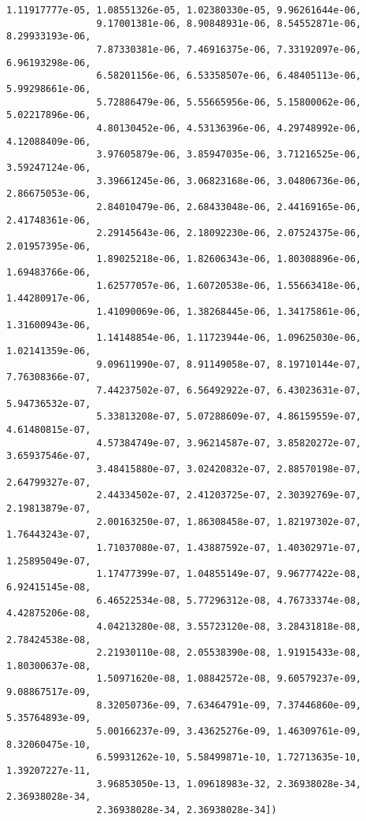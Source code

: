 \documentclass[11pt]{article}
\begin{document}
\begin{Verbatim}[commandchars=\\\{\}]
                1.11917777e-05, 1.08551326e-05, 1.02380330e-05, 9.96261644e-06,
                9.17001381e-06, 8.90848931e-06, 8.54552871e-06, 8.29933193e-06,
                7.87330381e-06, 7.46916375e-06, 7.33192097e-06, 6.96193298e-06,
                6.58201156e-06, 6.53358507e-06, 6.48405113e-06, 5.99298661e-06,
                5.72886479e-06, 5.55665956e-06, 5.15800062e-06, 5.02217896e-06,
                4.80130452e-06, 4.53136396e-06, 4.29748992e-06, 4.12088409e-06,
                3.97605879e-06, 3.85947035e-06, 3.71216525e-06, 3.59247124e-06,
                3.39661245e-06, 3.06823168e-06, 3.04806736e-06, 2.86675053e-06,
                2.84010479e-06, 2.68433048e-06, 2.44169165e-06, 2.41748361e-06,
                2.29145643e-06, 2.18092230e-06, 2.07524375e-06, 2.01957395e-06,
                1.89025218e-06, 1.82606343e-06, 1.80308896e-06, 1.69483766e-06,
                1.62577057e-06, 1.60720538e-06, 1.55663418e-06, 1.44280917e-06,
                1.41090069e-06, 1.38268445e-06, 1.34175861e-06, 1.31600943e-06,
                1.14148854e-06, 1.11723944e-06, 1.09625030e-06, 1.02141359e-06,
                9.09611990e-07, 8.91149058e-07, 8.19710144e-07, 7.76308366e-07,
                7.44237502e-07, 6.56492922e-07, 6.43023631e-07, 5.94736532e-07,
                5.33813208e-07, 5.07288609e-07, 4.86159559e-07, 4.61480815e-07,
                4.57384749e-07, 3.96214587e-07, 3.85820272e-07, 3.65937546e-07,
                3.48415880e-07, 3.02420832e-07, 2.88570198e-07, 2.64799327e-07,
                2.44334502e-07, 2.41203725e-07, 2.30392769e-07, 2.19813879e-07,
                2.00163250e-07, 1.86308458e-07, 1.82197302e-07, 1.76443243e-07,
                1.71037080e-07, 1.43887592e-07, 1.40302971e-07, 1.25895049e-07,
                1.17477399e-07, 1.04855149e-07, 9.96777422e-08, 6.92415145e-08,
                6.46522534e-08, 5.77296312e-08, 4.76733374e-08, 4.42875206e-08,
                4.04213280e-08, 3.55723120e-08, 3.28431818e-08, 2.78424538e-08,
                2.21930110e-08, 2.05538390e-08, 1.91915433e-08, 1.80300637e-08,
                1.50971620e-08, 1.08842572e-08, 9.60579237e-09, 9.08867517e-09,
                8.32050736e-09, 7.63464791e-09, 7.37446860e-09, 5.35764893e-09,
                5.00166237e-09, 3.43625276e-09, 1.46309761e-09, 8.32060475e-10,
                6.59931262e-10, 5.58499871e-10, 1.72713635e-10, 1.39207227e-11,
                3.96853050e-13, 1.09618983e-32, 2.36938028e-34, 2.36938028e-34,
                2.36938028e-34, 2.36938028e-34])
\end{Verbatim}
            
\end{document}
